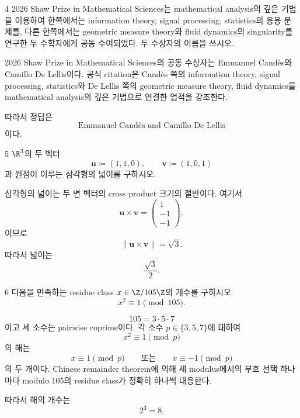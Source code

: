 \begin{problem}{4}
2026 Shaw Prize in Mathematical Sciences는 mathematical analysis의 깊은 기법을 이용하여 한쪽에서는 information theory, signal processing, statistics의 응용 문제를, 다른 한쪽에서는 geometric measure theory와 fluid dynamics의 singularity를 연구한 두 수학자에게 공동 수여되었다. 두 수상자의 이름을 쓰시오.
\end{problem}

\begin{solution}
2026 Shaw Prize in Mathematical Sciences의 공동 수상자는 Emmanuel Cand\`es와 Camillo De Lellis이다. 공식 citation은 Cand\`es 쪽의 information theory, signal processing, statistics와 De Lellis 쪽의 geometric measure theory, fluid dynamics를 mathematical analysis의 깊은 기법으로 연결한 업적을 강조한다.

따라서 정답은
\[
    \boxed{\text{Emmanuel Cand\`es and Camillo De Lellis}}
\]
이다.
\end{solution}

\begin{problem}{5}
$\R^3$의 두 벡터
\[
    \mathbf{u}\coloneqq(1,1,0),
    \qquad
    \mathbf{v}\coloneqq(1,0,1)
\]
과 원점이 이루는 삼각형의 넓이를 구하시오.
\end{problem}

\begin{solution}
삼각형의 넓이는 두 변 벡터의 cross product 크기의 절반이다. 여기서
\[
    \mathbf{u}\times\mathbf{v}
    =
    \begin{pmatrix}
        1\\-1\\-1
    \end{pmatrix},
\]
이므로
\[
    \|\mathbf{u}\times\mathbf{v}\|
    =\sqrt3.
\]
따라서 넓이는
\[
    \boxed{\frac{\sqrt3}{2}}.
\]
\end{solution}

\begin{problem}{6}
다음을 만족하는 residue class $x\in\Z/105\Z$의 개수를 구하시오.
\[
    x^2\equiv1\pmod{105}.
\]
\end{problem}

\begin{solution}
\[
    105=3\cdot5\cdot7
\]
이고 세 소수는 pairwise coprime이다. 각 소수 $p\in\{3,5,7\}$에 대하여
\[
    x^2\equiv1\pmod p
\]
의 해는
\[
    x\equiv1\pmod p
    \qquad\text{또는}\qquad
    x\equiv-1\pmod p
\]
의 두 개이다. Chinese remainder theorem에 의해 세 modulus에서의 부호 선택 하나마다 modulo $105$의 residue class가 정확히 하나씩 대응한다.

따라서 해의 개수는
\[
    2^3=\boxed{8}.
\]
\end{solution}

